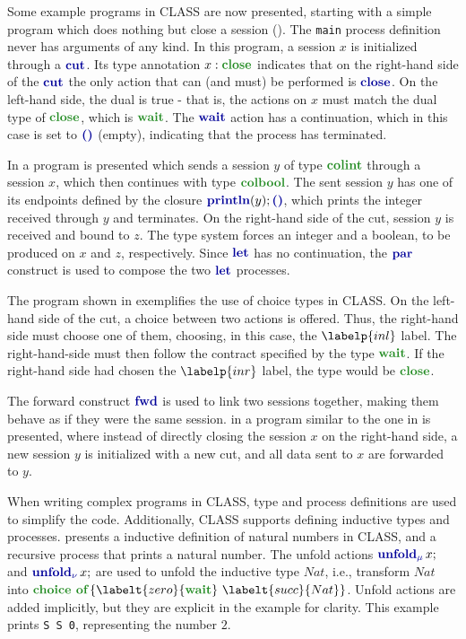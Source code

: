 Some example programs in \ac{CLASS} are now presented, starting with a simple program which does nothing but close a session (). The \texttt{main} process definition never has arguments of any kind. In this program, a session $x$ is initialized through a $\cutp$. Its type annotation $x: \closet$ indicates that on the right-hand side of the $\cutp$ the only action that can (and must) be performed is $\closep$. On the left-hand side, the dual is true - that is, the actions on $x$ must match the dual type of $\closet$, which is $\waitt$. The $\waitp$ action has a continuation, which in this case is set to $\emptyc$ (empty), indicating that the process has terminated.

In  a program is presented which sends a session $y$ of type $\colintt$ through a session $x$, which then continues with type $\colboolt$. The sent session $y$ has one of its endpoints defined by the closure $\printlnc{y}{\emptyc}$, which prints the integer received through $y$ and terminates. On the right-hand side of the cut, session $y$ is received and bound to $z$. The type system forces an integer and a boolean, to be produced on $x$ and $z$, respectively. Since $\letp$ has no continuation, the $\parp$ construct is used to compose the two $\letp$ processes.

The program shown in  exemplifies the use of choice types in \ac{CLASS}. On the left-hand side of the cut, a choice between two actions is offered. Thus, the right-hand side must choose one of them, choosing, in this case, the $\labelp{inl}$ label. The right-hand-side must then follow the contract specified by the type $\waitt$. If the right-hand side had chosen the $\labelp{inr}$ label, the type would be $\closet$.

The forward construct $\fwdp$ is used to link two sessions together, making them behave as if they were the same session. in  a program similar to the one in  is presented, where instead of directly closing the session $x$ on the right-hand side, a new session $y$ is initialized with a new cut, and all data sent to $x$ are forwarded to $y$.

When writing complex programs in \ac{CLASS}, type and process definitions are used to simplify the code. Additionally, \ac{CLASS} supports defining inductive types and processes.  presents a inductive definition of natural numbers in \ac{CLASS}, and a recursive process that prints a natural number. The unfold actions $\unfoldmuc{x}$ and $\unfoldnuc{x}$ are used to unfold the inductive type $Nat$, i.e., transform $Nat$ into $\choicet{\labelt{zero}{\waitt}\ \labelt{succ}{Nat}}$. Unfold actions are added implicitly, but they are explicit in the example for clarity. This example prints \texttt{S S 0}, representing the number $2$.

